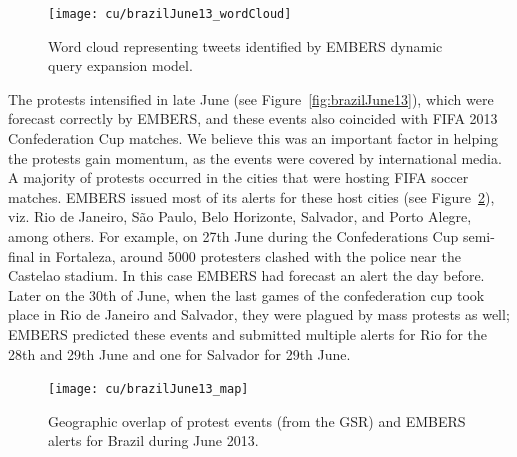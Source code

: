 \begin{figure}[H]
\centering
\texttt{[image: cu/brazilJune13\_wordCloud]}
\caption{Word cloud representing tweets identified by EMBERS dynamic query expansion model.}
\label{fig:brazilJune13_wordCloud}
\end{figure}

The protests intensified in late June (see Figure~\ref{fig:brazilJune13}), which were
forecast correctly by EMBERS, and these events
also coincided with FIFA 2013 Confederation Cup matches. We believe this was an important factor in helping
the protests gain momentum,
as the events were covered by international media. A majority of protests
occurred in the cities that were hosting FIFA soccer matches.
EMBERS issued most of its alerts for these host cities (see
Figure~\ref{fig:brazilJune13_map}), viz.
Rio de Janeiro, São Paulo,
Belo Horizonte, Salvador, and Porto Alegre,
among others. For example, on 27th June during the Confederations Cup
semi-final in Fortaleza, around 5000 protesters clashed with the police
near the Castelao stadium. In this case EMBERS had forecast an alert the
day before. Later on the 30th of June, when the last games of the
confederation cup took place in Rio de Janeiro and Salvador, they
were plagued by mass protests as well; EMBERS predicted these events and
submitted multiple alerts for Rio for the 28th and 29th June and one for
Salvador for 29th June.

\begin{figure}[H]
\centering
\texttt{[image: cu/brazilJune13\_map]}
\caption{Geographic overlap of protest events (from the GSR) and EMBERS
alerts for Brazil during June 2013.}
\label{fig:brazilJune13_map}
\end{figure}

